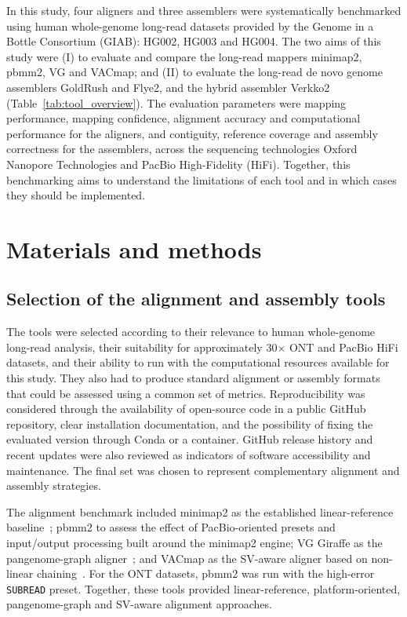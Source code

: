 \documentclass[12pt, letterpaper]{article}
\begin{document}
In this study, four aligners and three assemblers were systematically benchmarked using human whole-genome long-read datasets provided by the Genome in a Bottle Consortium (GIAB): HG002, HG003 and HG004. The two aims of this study were (I) to evaluate and compare the long-read mappers minimap2, pbmm2, VG and VACmap; and (II) to evaluate the long-read de novo genome assemblers GoldRush and Flye2, and the hybrid assembler Verkko2 (Table~\ref{tab:tool_overview}). The evaluation parameters were mapping performance, mapping confidence, alignment accuracy and computational performance for the aligners, and contiguity, reference coverage and assembly correctness for the assemblers, across the sequencing technologies Oxford Nanopore Technologies and PacBio High-Fidelity (HiFi). Together, this benchmarking aims to understand the limitations of each tool and in which cases they should be implemented.

\section{Materials and methods}

\subsection{Selection of the alignment and assembly tools}

The tools were selected according to their relevance to human whole-genome long-read analysis, their suitability for approximately 30$\times$ ONT and PacBio HiFi datasets, and their ability to run with the computational resources available for this study. They also had to produce standard alignment or assembly formats that could be assessed using a common set of metrics. Reproducibility was considered through the availability of open-source code in a public GitHub repository, clear installation documentation, and the possibility of fixing the evaluated version through Conda or a container. GitHub release history and recent updates were also reviewed as indicators of software accessibility and maintenance. The final set was chosen to represent complementary alignment and assembly strategies.

The alignment benchmark included minimap2 as the established linear-reference baseline~\cite{Li2018_Minimap2}; pbmm2 to assess the effect of PacBio-oriented presets and input/output processing built around the minimap2 engine; VG Giraffe as the pangenome-graph aligner~\cite{Chang2025,Sirén2021}; and VACmap as the SV-aware aligner based on non-linear chaining~\cite{vacmap2025}. For the ONT datasets, pbmm2 was run with the high-error \texttt{SUBREAD} preset. Together, these tools provided linear-reference, platform-oriented, pangenome-graph and SV-aware alignment approaches.
\end{document}
